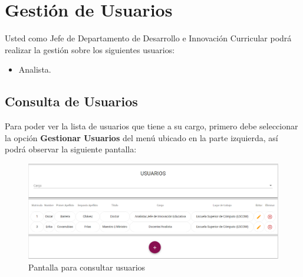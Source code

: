 \clearpage
\section{Gestión de Usuarios}

    Usted como Jefe de Departamento de Desarrollo e Innovación Curricular podrá realizar la gestión sobre los siguientes usuarios:
    \begin{itemize}
        \item Analista.
    \end{itemize}


    \subsection{Consulta de Usuarios}

        Para poder ver la lista de usuarios que tiene a su cargo, primero debe seleccionar la opción \textbf{Gestionar Usuarios} del menú ubicado en la parte izquierda, así podrá observar la siguiente pantalla:

        \begin{figure}[!hbtp]
            \centering
            \hypertarget{consultarUs}{\includegraphics[width=0.6\linewidth]{images/SP5/Consultar-Usuario}}
            \caption{Pantalla para consultar usuarios}
            \label{consultarrh}
        \end{figure}

